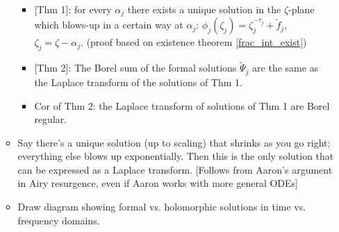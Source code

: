 \documentclass{article}
\begin{document}
\begin{itemize}
\begin{itemize}
\begin{itemize}
\item {[Thm 1]}: for every $\alpha_j$ there exists a unique solution in the $\zeta$-plane which blows-up in a certain way at $\alpha_j$: ${\phi}_j(\zeta_j)=\zeta_j^{-\tau_j}+\tilde{f}_j$, $\zeta_j=\zeta-\alpha_j$. (proof based on existence theorem \ref{frac_int_exist})
\item {[Thm 2]}: The Borel sum of the formal solutions $\tilde{\Psi}_j$ are the same as the Laplace transform of the solutions of Thm 1. 
\item Cor of Thm 2: the Laplace transform of solutions of Thm 1 are Borel regular.   
\end{itemize}
\item Say there's a unique solution (up to scaling) that shrinks as you go right; everything else blows up exponentially. Then this is the only solution that can be expressed as a Laplace transform. [Follows from Aaron's argument in Airy resurgence, even if Aaron works with more general ODEs]

\item Draw diagram showing formal vs. holomorphic solutions in time vs. frequency domains.

\begin{center}
\end{center}


\end{itemize}
\end{itemize}
\end{document}
